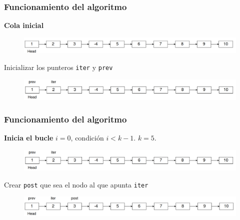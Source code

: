 \documentclass[17pt, t, lualatex]{beamer}
\newcommand{\cppinline}[1]{\lstinline[style=cppstyle]!#1!}
\begin{document}
\begin{frame}
  \frametitle{Funcionamiento del algoritmo}

  \textbf{Cola inicial}

  \begin{figure}[h]
    \centering
    \includegraphics[width=\textwidth]{img/fig3.png}
  \end{figure}

  Inicializar los punteros \cppinline{iter} y \cppinline{prev}

  \begin{figure}[h]
    \centering
    \includegraphics[width=\textwidth]{img/fig4.png}
  \end{figure}


\end{frame}

\begin{frame}
  \frametitle{Funcionamiento del algoritmo}

  \textbf{Inicia el bucle} $i = 0$, condición $i < k-1$. $k = 5$.

  \begin{figure}[h]
    \centering
    \includegraphics[width=\textwidth]{img/fig4.png}
  \end{figure}

  Crear \cppinline{post} que sea el nodo al que apunta \cppinline{iter}

  \begin{figure}[h]
    \centering
    \includegraphics[width=\textwidth]{img/fig5.png}
  \end{figure}


\end{frame}
\end{document}
